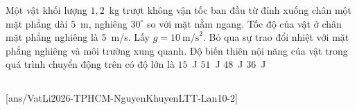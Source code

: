 	\begin{ex}%
		Một vật khối lượng $1{,}2$~kg trượt không vận tốc ban đầu từ đỉnh xuống chân một mặt phẳng dài $5$~m, nghiêng $30^\circ$ so với mặt nằm ngang. Tốc độ của vật ở chân mặt phẳng nghiêng là $5$~m/s. Lấy $g=10~\text{m/s}^2$. Bỏ qua sự trao đổi nhiệt với mặt phẳng nghiêng và môi trường xung quanh. Độ biến thiên nội năng của vật trong quá trình chuyển động trên có độ lớn là
		\choice
		{\True $15$~J}
		{$51$~J}
		{$48$~J}
		{$36$~J}
	\end{ex}

	\subsection*{}
	\setcounter{ex}{0}
	[ans/VatLi2026-TPHCM-NguyenKhuyenLTT-Lan10-2]

